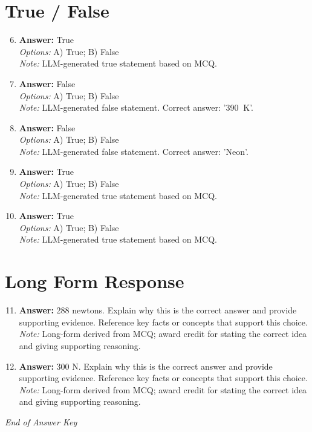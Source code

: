 \documentclass[12pt]{article}
\begin{document}
\section*{True / False}
\begin{enumerate}[label=\arabic*.]
\setcounter{enumi}{5}
\item \textbf{Answer:} True
\\ \textit{Options:} A) True; B) False
\\ \textit{Note:} LLM-generated true statement based on MCQ.
\item \textbf{Answer:} False
\\ \textit{Options:} A) True; B) False
\\ \textit{Note:} LLM-generated false statement. Correct answer: '390 $\mathrm{~K}$'.
\item \textbf{Answer:} False
\\ \textit{Options:} A) True; B) False
\\ \textit{Note:} LLM-generated false statement. Correct answer: 'Neon'.
\item \textbf{Answer:} True
\\ \textit{Options:} A) True; B) False
\\ \textit{Note:} LLM-generated true statement based on MCQ.
\item \textbf{Answer:} True
\\ \textit{Options:} A) True; B) False
\\ \textit{Note:} LLM-generated true statement based on MCQ.
\end{enumerate}

\section*{Long Form Response}
\begin{enumerate}[label=\arabic*.]
\setcounter{enumi}{10}
\item \textbf{Answer:} 288 newtons. Explain why this is the correct answer and provide supporting evidence. Reference key facts or concepts that support this choice.
\\ \textit{Note:} Long-form derived from MCQ; award credit for stating the correct idea and giving supporting reasoning.
\item \textbf{Answer:} 300 N. Explain why this is the correct answer and provide supporting evidence. Reference key facts or concepts that support this choice.
\\ \textit{Note:} Long-form derived from MCQ; award credit for stating the correct idea and giving supporting reasoning.
\end{enumerate}

\vfill
\noindent\textit{End of Answer Key}
\end{document}
